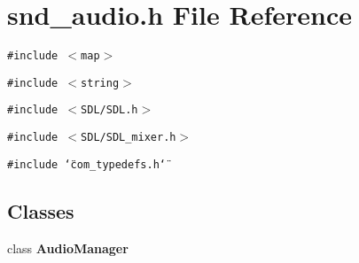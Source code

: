 \section{snd\_\-audio.h File Reference}
\label{snd__audio_8h}
{\tt \#include $<$map$>$}\par
{\tt \#include $<$string$>$}\par
{\tt \#include $<$SDL/SDL.h$>$}\par
{\tt \#include $<$SDL/SDL\_\-mixer.h$>$}\par
{\tt \#include \char`\"{}com\_\-typedefs.h\char`\"{}}\par
\subsection*{Classes}
\begin{CompactItemize}
\item 
class {\bf AudioManager}
\end{CompactItemize}

